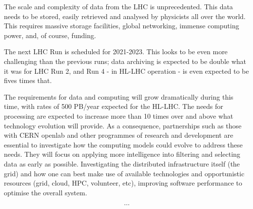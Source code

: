 The scale and complexity of data from the LHC is unprecedented. This data needs to be stored, easily retrieved and analysed by physicists all over the world. This requires massive storage facilities, global networking, immense computing power, and, of course, funding.


The next LHC Run is scheduled for 2021-2023. This looks to be even more challenging than the previous runs; data archiving is expected to be double what it was for LHC Run 2, and Run 4 - in HL-LHC operation - is even expected to be fives times that. 

The requirements for data and computing will grow dramatically during this time, with rates of 500 PB/year expected for the HL-LHC. The needs for processing are expected to increase more than 10 times over and above what technology evolution will provide. As a consequence, partnerships such as those with CERN openlab and other programmes of research and development are essential to investigate how the computing models could evolve to address these needs. They will focus on applying more intelligence into filtering and selecting data as early as possible. Investigating the distributed infrastructure itself (the grid) and how one can best make use of available technologies and opportunistic resources (grid, cloud, HPC, volunteer, etc), improving software performance to optimise the overall system.








$$\dots$$

